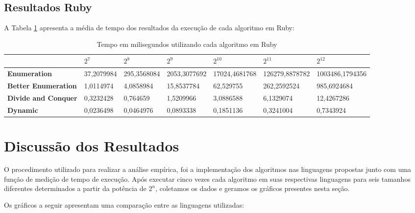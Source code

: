 \documentclass[
	12pt,				%
	oneside,   	        %
	a4paper,			%
	english,			%
	french,				%
	spanish,			%
	brazil,				%
	]{pacotes/abntex2}
\begin{document}
\subsection{Resultados Ruby}

A Tabela \ref{tab:ruby} apresenta a média de tempo dos resultados da execução de cada algoritmo em Ruby:

\begin{table}[!htb]
\centering
\caption{Tempo em milisegundos utilizando cada algoritmo em Ruby}
\label{tab:ruby}
\footnotesize   %
\begin{tabular}{l|llllll}
\toprule
\textbf{} & $2^7$ & $2^8$ & $2^9$ & $2^{10}$ & $2^{11}$ & $2^{12}$\\
\midrule
\textbf{Enumeration} & 37,2079984 & 295,3568084 & 2053,3077692 & 17024,4681768 & 126279,8878782 & 1003486,1794356\\
\textbf{Better Enumeration} & 1,0114974 & 4,0858984 & 15,8537784 & 62,529755 & 262,2592524 & 985,6924684\\
\textbf{Divide and Conquer} & 0,3232428 & 0,764659 & 1,5209966 & 3,0886588 & 6,1329074 & 12,4267286\\
\textbf{Dynamic} & 0,0236498 & 0,0464976 & 0,0893338 & 0,1851136 & 0,3241004 & 0,7343924\\
\bottomrule
\end{tabular}
\end{table}

\newpage
\section{Discussão dos Resultados}
\label{sec:discussao}

O  procedimento utilizado para realizar a análise empírica, foi a implementação dos algoritmos
nas linguagens propostas junto com uma função de medição de tempo de execução.
Após executar cinco vezes cada algoritmo em suas respectivas linguagens para seis tamanhos
diferentes determinados a partir da potência de  $2^{n}$, coletamos os dados e geramos os gráficos
presentes nesta seção.

Os gráficos a seguir apresentam uma comparação entre as linguagens utilizadas:
\end{document}
